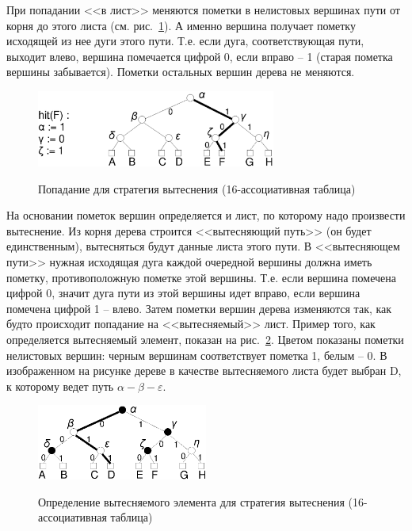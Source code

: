При попадании <<в лист>> меняются пометки в нелистовых вершинах пути от корня до
этого листа (см. рис.~\ref{pseudo_lru_hit}). А именно вершина получает пометку
исходящей из нее дуги этого пути. Т.е. если дуга, соответствующая пути, выходит
влево, вершина помечается цифрой 0, если вправо -- 1 (старая пометка вершины
забывается). Пометки остальных вершин дерева не меняются.

\begin{figure}[h] \center
  \includegraphics[width=0.7\textwidth]{2.theor/plruhit}\\
  \caption{Попадание для стратегия вытеснения \PseudoLRU
  (16-ассоциативная таблица)}\label{pseudo_lru_hit}
\end{figure}

На основании пометок вершин определяется и лист, по которому надо произвести
вытеснение.
Из корня дерева строится <<вытесняющий путь>> (он будет единственным),
вытесняться будут данные листа этого пути. В <<вытесняющем пути>> нужная
исходящая дуга каждой очередной вершины должна иметь пометку, противоположную
пометке этой вершины. Т.е. если вершина помечена цифрой 0, значит дуга пути из
этой вершины идет вправо, если вершина помечена цифрой 1 -- влево. Затем пометки
вершин дерева изменяются так, как будто происходит попадание на <<вытесняемый>>
лист. Пример того, как определяется вытесняемый элемент, показан на
рис.~\ref{pseudo_lru_miss}. Цветом показаны пометки нелистовых вершин: черным
вершинам соответствует пометка 1, белым
-- 0. В изображенном на рисунке дереве в качестве вытесняемого листа будет
выбран D, к которому ведет путь $\alpha-\beta-\varepsilon$.

\begin{figure}[h] \center
  \includegraphics[width=0.5\textwidth]{2.theor/plrumiss}\\
  \caption{Определение вытесняемого элемента для стратегия вытеснения
  \PseudoLRU (16-ассоциативная таблица)}\label{pseudo_lru_miss}
\end{figure}


